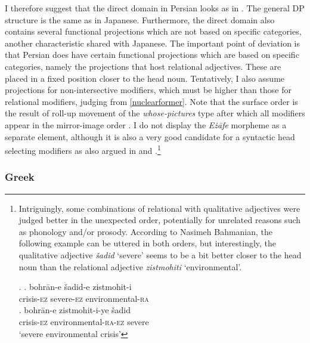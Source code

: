 I therefore suggest that the direct domain in Persian looks as in . The general DP structure is the same as in Japanese. Furthermore, the direct domain also contains several functional projections which are not based on specific categories, another characteristic shared with Japanese. The important point of deviation is that  Persian does have certain functional projections which are based on specific categories, namely the projections that host relational adjectives. These are placed in a fixed position closer to the head noun. Tentatively, I also assume projections for non-intersective modifiers, which must be higher than those for relational modifiers, judging from \ref{nuclearformer}. Note that the surface order is the result of roll-up movement of the \textit{whose-pictures} type after which all modifiers appear in the mirror-image order \citep{cinque:2017:micro, cinque:2023:linearization, kahne:2014:revisiting}. I do not display the \textit{E{\.z}āfe} morpheme as a separate element, although it is also a very good candidate for a syntactic head selecting modifiers as also argued in \citet{philip:2012:linkers, toosarvandani:2014:the, franco:2015:linkers} and \citet{gn:2024:morpho}.\footnote{Intriguingly, some combinations of relational with qualitative adjectives were judged better in the unexpected order, potentially for unrelated reasons such as phonology and/or prosody. According to Nasimeh Bahmanian, the following example can be uttered in both orders, but interestingly, the qualitative adjective \textit{šadid} `severe’ seems to be a bit better closer to the head noun than the relational adjective \textit{zistmohiti} `environmental’.

\par

\ex. \ag. bohrān-e šadid-e zistmohit-i\\
crisis-\textsc{ez} severe-\textsc{ez} environmental-\textsc{ra}\\
\bg. bohrān-e zistmohit-i-ye šadid\\
crisis-\textsc{ez} environmental-\textsc{ra-ez} severe\\
`severe environmental crisis'

\par

}



\subsubsection{Greek}

